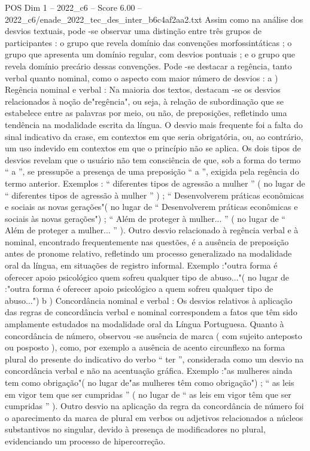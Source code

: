 \begin{textsample}{POS Dim 1 – 2022\_c6 – Score 6.00 – 2022\_c6/enade\_2022\_tec\_des\_inter\_b6c4af2aa2.txt}
Assim como na análise dos desvios textuais, pode -se observar uma distinção entre três grupos de participantes : o grupo que revela domínio das convenções morfossintáticas ; o grupo que apresenta um domínio regular, com desvios pontuais ; e o grupo que revela domínio precário dessas convenções.
Pode -se destacar a regência, tanto verbal quanto nominal, como o aspecto com maior número de desvios : a ) Regência nominal e verbal : Na maioria dos textos, destacam -se os desvios relacionados à noção de"regência", ou seja, à relação de subordinação que se estabelece entre as palavras por meio, ou não, de preposições, refletindo uma tendência na modalidade escrita da língua.
O desvio mais frequente foi a falta do sinal indicativo da crase, em contextos em que seria obrigatória, ou, ao contrário, um uso indevido em contextos em que o princípio não se aplica.
Os dois tipos de desvios revelam que o usuário não tem consciência de que, sob a forma do termo “ a ”, se pressupõe a presença de uma preposição “ a ”, exigida pela regência do termo anterior.
Exemplos : “ diferentes tipos de agressão a mulher ” ( no lugar de “ diferentes tipos de agressão à mulher ” ) ; “ Desenvolverem práticas econômicas e sociais as novas gerações"( no lugar de “ Desenvolverem práticas econômicas e sociais às novas gerações") ; “ Além de proteger à mulher... ” ( no lugar de “ Além de proteger a mulher... ” ).
Outro desvio relacionado à regência verbal e à nominal, encontrado frequentemente nas questões, é a ausência de preposição antes de pronome relativo, refletindo um processo generalizado na modalidade oral da língua, em situações de registro informal.
Exemplo :"outra forma é oferecer apoio psicológico quem sofreu qualquer tipo de abuso..."( no lugar de :"outra forma é oferecer apoio psicológico a quem sofreu qualquer tipo de abuso...") b ) Concordância nominal e verbal : Os desvios relativos à aplicação das regras de concordância verbal e nominal correspondem a fatos que têm sido amplamente estudados na modalidade oral da Língua Portuguesa.
Quanto à concordância de número, observou -se ausência de marca ( com sujeito anteposto ou posposto ), como, por exemplo a ausência de acento circunflexo na forma plural do presente do indicativo do verbo “ ter ”, considerada como um desvio na concordância verbal e não na acentuação gráfica.
Exemplo :"as mulheres ainda tem como obrigação"( no lugar de"as mulheres têm como obrigação") ; “ as leis em vigor tem que ser cumpridas ” ( no lugar de “ as leis em vigor têm que ser cumpridas ” ).
Outro desvio na aplicação da regra da concordância de número foi o aparecimento da marca de plural em verbos ou adjetivos relacionados a núcleos substantivos no singular, devido à presença de modificadores no plural, evidenciando um processo de hipercorreção.

\end{textsample}
